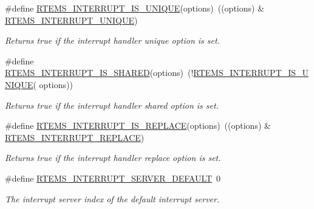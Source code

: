 \begin{DoxyCompactItemize}
\#define \mbox{\hyperlink{group__rtems__interrupt__extension_ga2058eb9a90d813aced09c21a4ce61829}{R\+T\+E\+M\+S\+\_\+\+I\+N\+T\+E\+R\+R\+U\+P\+T\+\_\+\+I\+S\+\_\+\+U\+N\+I\+Q\+UE}}(options)~((options) \& \mbox{\hyperlink{group__rtems__interrupt__extension_ga5f61e9433b266894801af5ed9992efac}{R\+T\+E\+M\+S\+\_\+\+I\+N\+T\+E\+R\+R\+U\+P\+T\+\_\+\+U\+N\+I\+Q\+UE}})
\begin{DoxyCompactList}\small\item\em Returns true if the interrupt handler unique option is set. \end{DoxyCompactList}\item 
\mbox{\label{group__rtems__interrupt__extension_gaaac773d66ae1853eda87897569730caa}} 
\#define \mbox{\hyperlink{group__rtems__interrupt__extension_gaaac773d66ae1853eda87897569730caa}{R\+T\+E\+M\+S\+\_\+\+I\+N\+T\+E\+R\+R\+U\+P\+T\+\_\+\+I\+S\+\_\+\+S\+H\+A\+R\+ED}}(options)~(!\mbox{\hyperlink{group__rtems__interrupt__extension_ga2058eb9a90d813aced09c21a4ce61829}{R\+T\+E\+M\+S\+\_\+\+I\+N\+T\+E\+R\+R\+U\+P\+T\+\_\+\+I\+S\+\_\+\+U\+N\+I\+Q\+UE}}( options))
\begin{DoxyCompactList}\small\item\em Returns true if the interrupt handler shared option is set. \end{DoxyCompactList}\item 
\mbox{\label{group__rtems__interrupt__extension_ga999cfa3290ebd1618abcb265d772a5c2}} 
\#define \mbox{\hyperlink{group__rtems__interrupt__extension_ga999cfa3290ebd1618abcb265d772a5c2}{R\+T\+E\+M\+S\+\_\+\+I\+N\+T\+E\+R\+R\+U\+P\+T\+\_\+\+I\+S\+\_\+\+R\+E\+P\+L\+A\+CE}}(options)~((options) \& \mbox{\hyperlink{group__rtems__interrupt__extension_gaca2eb7f8caa5eda72bd6924ee4c8e5d3}{R\+T\+E\+M\+S\+\_\+\+I\+N\+T\+E\+R\+R\+U\+P\+T\+\_\+\+R\+E\+P\+L\+A\+CE}})
\begin{DoxyCompactList}\small\item\em Returns true if the interrupt handler replace option is set. \end{DoxyCompactList}\item 
\mbox{\label{group__rtems__interrupt__extension_ga756752bdffd9e7115d4395d53248b6c8}} 
\#define \mbox{\hyperlink{group__rtems__interrupt__extension_ga756752bdffd9e7115d4395d53248b6c8}{R\+T\+E\+M\+S\+\_\+\+I\+N\+T\+E\+R\+R\+U\+P\+T\+\_\+\+S\+E\+R\+V\+E\+R\+\_\+\+D\+E\+F\+A\+U\+LT}}~0
\begin{DoxyCompactList}\small\item\em The interrupt server index of the default interrupt server. \end{DoxyCompactList}\end{DoxyCompactItemize}
